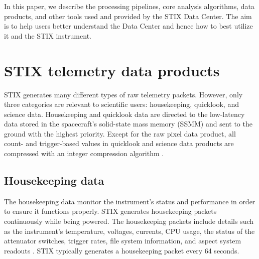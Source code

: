 \documentclass[referee]{aa} %
\begin{document}
 In this paper, we describe the processing pipelines, core analysis algorithms, data products, and other tools used and provided by the STIX Data Center.  The aim is to help users better understand the Data Center and hence how to best utilize it and the STIX instrument.

\section{STIX telemetry data products}
\label{sec:raw-data}
STIX generates many different types of raw telemetry packets.
However, only three categories are relevant to scientific users: housekeeping, quicklook, and  science data. Housekeeping and quicklook data are directed to the low-latency data stored in the spacecraft's solid-state mass memory (SSMM) and sent to the ground with the highest priority.
Except for the raw pixel data product, all count- and trigger-based values in quicklook and  science data products are compressed with an integer compression algorithm \citep{stix2020}.

\subsection{Housekeeping  data}
 The housekeeping data monitor the instrument's status and performance in order to ensure it functions properly. 
 STIX generates housekeeping packets continuously while being powered.  
 The housekeeping packets include details such as the instrument's temperature, 
 voltages, currents, CPU usage, the status of the attenuator switches, 
 trigger rates, file system information, and aspect system readouts \citep{Warmuth2020, stix2020}. STIX typically generates a  housekeeping packet every 64 seconds. %
 
\end{document}
